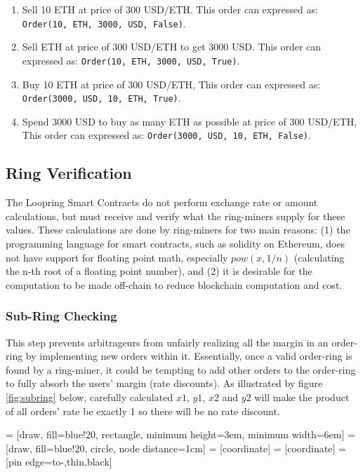 \documentclass[UTF8,nofonts]{article}
\makeatletter
\newenvironment{figurehere}
 {\def\@captype{figure}}
 {}
\makeatother
\begin{document}
\begin{multicols}{2}
\begin{enumerate}
	\item Sell 10 ETH at price of 300 USD/ETH. This order can expressed as: \verb|Order(10, ETH, 3000, USD, False)|.
	\item Sell ETH at price of 300 USD/ETH to get 3000 USD. This order can expressed as: \verb|Order(10, ETH, 3000, USD, True)|.
	\item Buy 10 ETH at price of 300 USD/ETH, This order can expressed as: \verb|Order(3000, USD, 10, ETH, True)|.
	\item Spend 3000 USD to buy as many ETH as possible at price of 300 USD/ETH, This order can expressed as: \verb|Order(3000, USD, 10, ETH, False)|.
\end{enumerate}



\subsection{Ring Verification\label{sec:ring_verification}}

The Loopring Smart Contracts do not perform exchange rate or amount calculations, but must receive and verify what the ring-miners supply for these values. These calculations are done by ring-miners for two main reasons: (1) the programming language for smart contracts, such as solidity\cite{dannen2017introducing} on Ethereum, does not have support for floating point math, especially $pow(x, 1/n)$ (calculating the n-th root of a floating point number), and (2) it is desirable for the computation to be made off-chain to reduce blockchain computation and cost.


\subsubsection{Sub-Ring Checking\label{sec:sub_ring_check}}
This step prevents arbitrageurs from unfairly realizing all the margin in an order-ring by implementing new orders within it. Essentially, once a valid order-ring is found by a ring-miner, it could be tempting to add other orders to the order-ring to fully absorb the users' margin (rate discounts). As illustrated by figure \ref{fig:subring} below, carefully calculated $x1$, $y1$, $x2$ and $y2$ will make the product of all orders' rate be exactly 1 so there will be no rate discount. 

\begin{center}
\begin{figurehere}
\centering
{} = [draw, fill=blue!20, rectangle, 
    minimum height=3em, minimum width=6em]
 = [draw, fill=blue!20, circle, node distance=1cm]
 = [coordinate]
 = [coordinate]
 = [pin edge={to-,thin,black}]


\end{figurehere}
\end{center}
\end{multicols}
\end{document}
